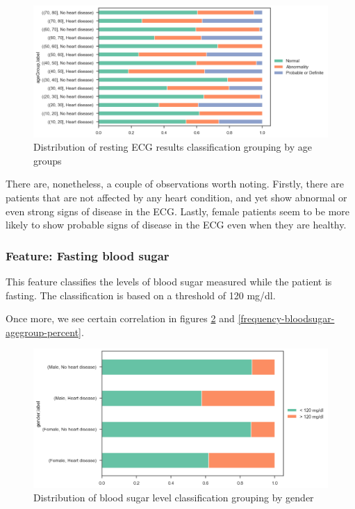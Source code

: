 \begin{figure}[H]
    \caption{Distribution of resting ECG results classification grouping by age groups}\label{frequency-ecg-agegroup-percent}
    \centering
    \includegraphics[width=\linewidth]{media/frequency-06-agegroup-ecg.png}
\end{figure}

There are, nonetheless, a couple of observations worth noting. Firstly, there are patients that are not affected
by any heart condition, and yet show abnormal or even strong signs of disease in the ECG. Lastly, female patients
seem to be more likely to show probable signs of disease in the ECG even when they are healthy.

\subsubsection{Feature: Fasting blood sugar}

This feature classifies the levels of blood sugar measured while the patient is fasting. The classification is based
on a threshold of 120 mg/dl.

Once more, we see certain correlation in figures \ref{frequency-bloodsugar-gender-percent} and
\ref{frequency-bloodsugar-agegroup-percent}.

\begin{figure}[H]
    \caption{Distribution of blood sugar level classification grouping by gender}\label{frequency-bloodsugar-gender-percent}
    \centering
    \includegraphics[width=\linewidth]{media/frequency-07-gender-bloodsugar.png}
\end{figure}

